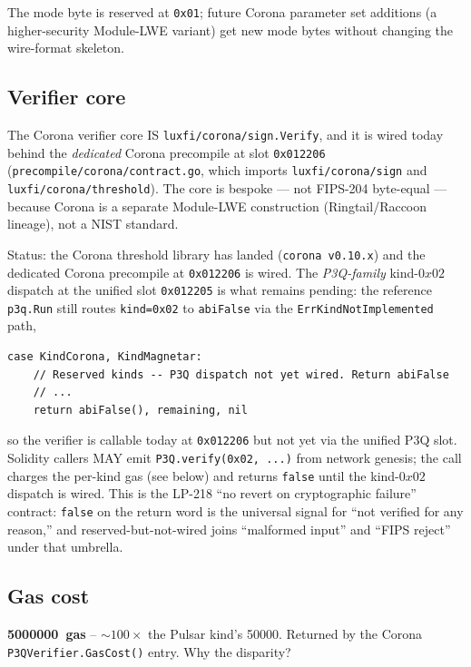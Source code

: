 The mode byte is reserved at \texttt{0x01}; future Corona
parameter set additions (a higher-security Module-LWE variant) get
new mode bytes without changing the wire-format skeleton.

\subsection{Verifier core}

The Corona verifier core IS \texttt{luxfi/corona/sign.Verify}, and it is
wired today behind the \emph{dedicated} Corona precompile at slot
\texttt{0x012206} (\texttt{precompile/corona/contract.go}, which imports
\texttt{luxfi/corona/sign} and \texttt{luxfi/corona/threshold}). The core
is bespoke --- not FIPS-204 byte-equal --- because Corona is a separate
Module-LWE construction (Ringtail/Raccoon lineage), not a NIST standard.

Status: the Corona threshold library has landed (\texttt{corona v0.10.x})
and the dedicated Corona precompile at \texttt{0x012206} is wired. The
\emph{P3Q-family} kind-$0x02$ dispatch at the unified slot
\texttt{0x012205} is what remains pending: the reference \texttt{p3q.Run}
still routes \texttt{kind=0x02} to \texttt{abiFalse} via the
\texttt{ErrKindNotImplemented} path,

\begin{lstlisting}[language={}]
case KindCorona, KindMagnetar:
    // Reserved kinds -- P3Q dispatch not yet wired. Return abiFalse
    // ...
    return abiFalse(), remaining, nil
\end{lstlisting}

so the verifier is callable today at \texttt{0x012206} but not yet via
the unified P3Q slot. Solidity callers MAY emit
\texttt{P3Q.verify(0x02, ...)} from network genesis; the call charges the
per-kind gas (see below) and returns \texttt{false} until the kind-$0x02$
dispatch is wired. This is the
LP-218 ``no revert on cryptographic failure'' contract:
\texttt{false} on the return word is the universal signal for
``not verified for any reason,'' and reserved-but-not-wired
joins ``malformed input'' and ``FIPS reject'' under that
umbrella.

\subsection{Gas cost}

\textbf{\SI{5000000}{gas}} -- $\sim$$100\times$ the Pulsar
kind's \SI{50000}{}. Returned by the Corona
\texttt{P3QVerifier.GasCost()} entry. Why the disparity?

